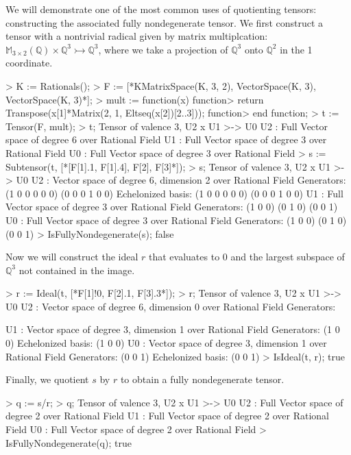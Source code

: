 \begin{example}[Quotients]

We will demonstrate one of the most common uses of quotienting tensors: constructing the associated fully nondegenerate tensor. 
We first construct a tensor with a nontrivial radical given by matrix multiplcation: $\mathbb{M}_{3\times 2}(\mathbb{Q})\times \mathbb{Q}^3\rightarrowtail \mathbb{Q}^3$, where we take a projection of $\mathbb{Q}^3$ onto $\mathbb{Q}^2$ in the 1 coordinate.
\begin{code}
> K := Rationals();
> F := [*KMatrixSpace(K, 3, 2), VectorSpace(K, 3), VectorSpace(K, 3)*];
> mult := function(x)
function>   return Transpose(x[1]*Matrix(2, 1, Eltseq(x[2])[2..3]));
function> end function;
> t := Tensor(F, mult);
> t;
Tensor of valence 3, U2 x U1 >-> U0
U2 : Full Vector space of degree 6 over Rational Field
U1 : Full Vector space of degree 3 over Rational Field
U0 : Full Vector space of degree 3 over Rational Field
> s := Subtensor(t, [*[F[1].1, F[1].4], F[2], F[3]*]);
> s;
Tensor of valence 3, U2 x U1 >-> U0
U2 : Vector space of degree 6, dimension 2 over Rational Field
Generators:
(1 0 0 0 0 0)
(0 0 0 1 0 0)
Echelonized basis:
(1 0 0 0 0 0)
(0 0 0 1 0 0)
U1 : Full Vector space of degree 3 over Rational Field
Generators:
(1 0 0)
(0 1 0)
(0 0 1)
U0 : Full Vector space of degree 3 over Rational Field
Generators:
(1 0 0)
(0 1 0)
(0 0 1)
> IsFullyNondegenerate(s);
false
\end{code}

Now we will construct the ideal $r$ that evaluates to 0 and the largest subspace of $\mathbb{Q}^3$ not contained in the image.
\begin{code}
> r := Ideal(t, [*F[1]!0, F[2].1, F[3].3*]);
> r;
Tensor of valence 3, U2 x U1 >-> U0
U2 : Vector space of degree 6, dimension 0 over Rational Field
Generators:

U1 : Vector space of degree 3, dimension 1 over Rational Field
Generators:
(1 0 0)
Echelonized basis:
(1 0 0)
U0 : Vector space of degree 3, dimension 1 over Rational Field
Generators:
(0 0 1)
Echelonized basis:
(0 0 1)
> IsIdeal(t, r);
true
\end{code}

Finally, we quotient $s$ by $r$ to obtain a fully nondegenerate tensor.
\begin{code}
> q := s/r;
> q;
Tensor of valence 3, U2 x U1 >-> U0
U2 : Full Vector space of degree 2 over Rational Field
U1 : Full Vector space of degree 2 over Rational Field
U0 : Full Vector space of degree 2 over Rational Field
> IsFullyNondegenerate(q);
true
\end{code}
\end{example}

